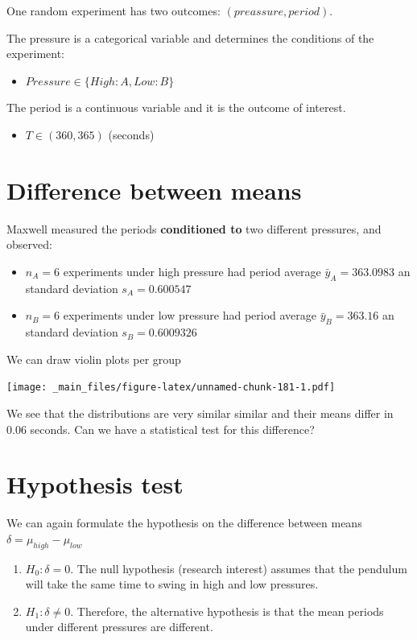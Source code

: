 \documentclass[
]{book}
\providecommand{\tightlist}{%
  \setlength{\itemsep}{0pt}\setlength{\parskip}{0pt}}
\begin{document}
One random experiment has two outcomes: \((preassure, period)\).

The pressure is a categorical variable and determines the conditions of the experiment:

\begin{itemize}
\tightlist
\item
  \(Pressure \in \{High:A, Low:B\}\)
\end{itemize}

The period is a continuous variable and it is the outcome of interest.

\begin{itemize}
\tightlist
\item
  \(T \in (360, 365)\) (seconds)
\end{itemize}

\hypertarget{difference-between-means-1}{%
\section{Difference between means}\label{difference-between-means-1}}

Maxwell measured the periods \textbf{conditioned to} two different pressures, and observed:

\begin{itemize}
\item
  \(n_A=6\) experiments under high pressure had period average \(\bar{y}_A=363.0983\) an standard deviation \(s_A=0.600547\)
\item
  \(n_B=6\) experiments under low pressure had period average \(\bar{y}_B=363.16\) an standard deviation \(s_B=0.6009326\)
\end{itemize}

We can draw violin plots per group

\texttt{[image: \_main\_files/figure-latex/unnamed-chunk-181-1.pdf]}

We see that the distributions are very similar similar and their means differ in 0.06 seconds. Can we have a statistical test for this difference?

\hypertarget{hypothesis-test-1}{%
\section{Hypothesis test}\label{hypothesis-test-1}}

We can again formulate the hypothesis on the difference between means \(\delta=\mu_{high} -\mu_{low}\)

\begin{enumerate}
\def\labelenumi{\alph{enumi}.}
\item
  \(H_0: \delta=0\). The null hypothesis (research interest) assumes that the pendulum will take the same time to swing in high and low pressures.
\item
  \(H_1: \delta \neq 0\). Therefore, the alternative hypothesis is that the mean periods under different pressures are different.
\end{enumerate}
\end{document}
